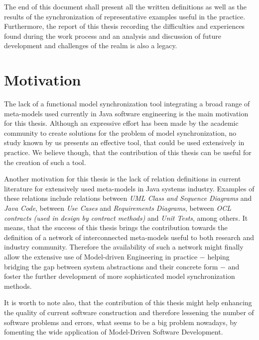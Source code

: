 \documentclass[tuberlin,cic,tc,english,noabntcite]{iiufrgs}
\begin{document}
The end of this document shall present all the written definitions as well as the results of the synchronization of representative examples useful in the practice. Furthermore, the report of this thesis recording the difficulties and experiences found during the work process and an analysis and discussion of future development and challenges of the realm is also a legacy.

\section{Motivation}
The lack of a functional model synchronization tool integrating a broad range of meta-models used currently in Java software engineering is the main motivation for this thesis. Although an expressive effort has been made by the academic community to create solutions for the problem of model synchronization, no study known by us presents an effective tool, that could be used extensively in practice. We believe though, that the contribution of this thesis can be useful for the creation of such a tool.
	
Another motivation for this thesis is the lack of relation definitions in current literature for extensively used meta-models in Java systems industry. Examples of these relations include relations between \emph{UML Class and Sequence Diagrams} and \emph{Java Code}, between \emph{Use Cases} and \emph{Requirements Diagrams}, between \emph{OCL contracts (used in design by contract methods)} and \emph{Unit Tests}, among others. It means, that the success of this thesis brings the contribution towards the definition of a network of interconnected meta-models useful to both research and industry community. Therefore the availability of such a network might finally allow the extensive use of Model-driven Engineering in practice $-$ helping bridging the gap between system abstractions and their concrete form $-$ and foster the further development of more sophisticated model synchronization methods.

It is worth to note also, that the contribution of this thesis might help enhancing the quality of current software construction and therefore lessening the number of software problems and errors, what seems to be a big problem nowadays, by fomenting the wide application of Model-Driven Software Development.

\end{document}
